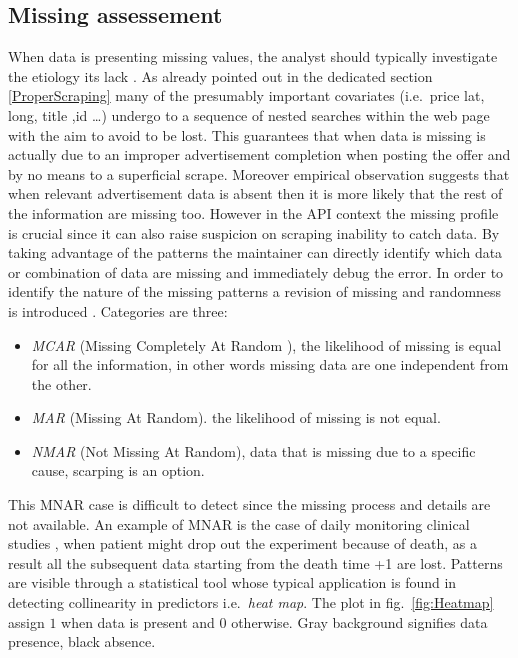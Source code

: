 \documentclass[
  12pt,
  a4paper,
  oneside]{book}
\providecommand{\tightlist}{%
  \setlength{\itemsep}{0pt}\setlength{\parskip}{0pt}}
\theoremstyle{definition}
\theoremstyle{definition}
\theoremstyle{definition}
\theoremstyle{remark}
\begin{document}
\hypertarget{missing-assessement}{%
\subsection{Missing assessement}\label{missing-assessement}}

When data is presenting missing values, the analyst should typically investigate the etiology its lack \citep{Kuhn}. As already pointed out in the dedicated section \ref{ProperScraping} many of the presumably important covariates (i.e.~price lat, long, title ,id \ldots) undergo to a sequence of nested searches within the web page with the aim to avoid to be lost. This guarantees that when data is missing is actually due to an improper advertisement completion when posting the offer and by no means to a superficial scrape. Moreover empirical observation suggests that when relevant advertisement data is absent then it is more likely that the rest of the information are missing too.
However in the API context the missing profile is crucial since it can also raise suspicion on scraping inability to catch data. By taking advantage of the patterns the maintainer can directly identify which data or combination of data are missing and immediately debug the error. In order to identify the nature of the missing patterns a revision of missing and randomness is introduced \citep{Little}.
Categories are three:

\begin{itemize}
\tightlist
\item
  \emph{MCAR} (Missing Completely At Random ), the likelihood of missing is equal for all the information, in other words missing data are one independent from the other.
\item
  \emph{MAR} (Missing At Random). the likelihood of missing is not equal.
\item
  \emph{NMAR} (Not Missing At Random), data that is missing due to a specific cause, scarping is an option.
\end{itemize}

This MNAR case is difficult to detect since the missing process and details are not available. An example of MNAR is the case of daily monitoring clinical studies \citeyearpar{Kuhn}, when patient might drop out the experiment because of death, as a result all the subsequent data starting from the death time +1 are lost.
Patterns are visible through a statistical tool whose typical application is found in detecting collinearity in predictors i.e.~\emph{heat map}. The plot in fig.~\ref{fig:Heatmap} assign \(1\) when data is present and \(0\) otherwise. Gray background signifies data presence, black absence.
\end{document}
